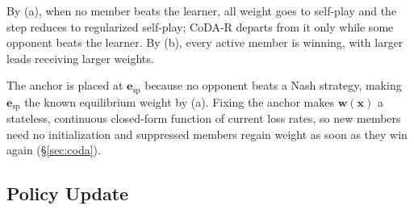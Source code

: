 \documentclass{article} %
\theoremstyle{plain}
\theoremstyle{remark}
\newcommand{\bx}{{\bm{x}}}
\newcommand{\bw}{{\bm{w}}}
\newcommand{\be}{{\bm{e}}}
\newcommand{\esp}{\be_{\mathrm{sp}}}
\newcommand{\codar}{CoDA-R}
\begin{document}
By (a), when no member beats the learner, all weight goes to self-play and the step reduces to regularized self-play; \codar{} departs from it only while some opponent beats the learner. By (b), every active member is winning, with larger leads receiving larger weights.

The anchor is placed at $\esp$ because no opponent beats a Nash strategy, making $\esp$ the known equilibrium weight by (a). Fixing the anchor makes $\bw(\bx)$ a stateless, continuous closed-form function of current loss rates, so new members need no initialization and suppressed members regain weight as soon as they win again (\S\ref{sec:coda}).

\subsection{Policy Update}
\label{sec:primal}
\end{document}

